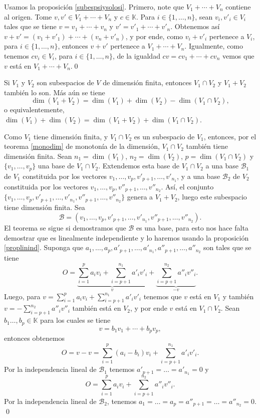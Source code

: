 \dem Usamos la proposición \ref{subespsiysolosi}. Primero, note que $V_1+\cdots+V_n$ contiene al origen. Tome $v,v'\in  V_1+\cdots+V_n$ y $c\in \mathbb{K}$. Para $i\in\{1,\ldots,n\}$, sean $v_i,v'_i\in V_i$ tales que se tiene $v=v_1+\cdots+v_n$ y $v'=v'_1+\cdots+v'_n$. Obtenemos as\'i $v+v'=(v_1+v'_1)+\cdots+(v_n+v'_n)$, y por ende, como $v_i+v'_i$ pertenece a $V_i$, para $i\in\{1,\ldots,n\}$, entonces $v+v'$ pertenece a $V_1+\cdots+V_n$. Igualmente, como tenemos $cv_i\in V_i$, para $i\in\{1,\ldots,n\}$, de la igualdad $cv=cv_1+\cdots+cv_n$ vemos que $v$ est\'a en $V_1+\cdots+V_n$.\qed

\begin{teo}\label{sumaint}
Si $V_1$ y $V_2$ son subespacios de $V$ de dimensi\'on finita, entonces $V_1\cap V_2$ y $V_1+V_2$ tambi\'en lo son. M\'as a\'un se tiene
\[
\dim(V_1+V_2)=\dim(V_1)+\dim(V_2)-\dim(V_1\cap V_2),
\]
o equivalentemente, $\dim(V_1)+\dim(V_2)=\dim(V_1+V_2)+\dim(V_1\cap V_2)$.
\end{teo}

\dem Como $V_1$ tiene dimensi\'on finita, y $V_1\cap V_2$ es un subespacio de $V_1$, entonces, por el teorema \ref{monodim} de monotonía de la dimensión, $V_1\cap V_2$ tambi\'en tiene dimensi\'on finita. Sean $n_1=\dim(V_1)$, $n_2=\dim(V_2)$, $p=\dim(V_1\cap V_2)$ y $\{v_1,\ldots,v_p\}$ una base de $V_1\cap V_2$. Extendemos esta base de $V_1\cap V_2$ a una base $\mathcal{B}_1$ de $V_1$ constituida por los vectores $v_1,\ldots,v_p,v'_{p+1},\ldots,v'_{n_1}$, y a una base $\mathcal{B}_2$ de $V_2$ constituida por los vectores $v_1,\ldots,v_p,v''_{p+1},\ldots,v''_{n_2}$. As\'i, el conjunto $\{v_1,\ldots,v_p,v'_{p+1},\ldots,v'_{n_1},v''_{p+1},\ldots,v''_{n_2}\}$ genera a $V_1+V_2$, luego este subespacio tiene dimensi\'on finita. Sea $$\mathcal{B}=(v_1,\ldots,v_p,v'_{p+1},\ldots,v'_{n_1},v''_{p+1},\ldots,v''_{n_2}).$$ El teorema se sigue si demostramos que $\mathcal{B}$ es una base, para esto nos hace falta demostrar que es linealmente independiente y lo haremos usando la proposici\'on \ref{proplinind}. Suponga que $a_1,\ldots,a_p,a'_{p+1},\ldots,a'_{n_1},a''_{p+1},\ldots,a''_{n_2}$ son tales que se tiene
\[
O=\underbrace{\sum_{i=1}^p a_iv_i+\sum_{i=p+1}^{n_1}a'_iv'_i}_{v}+\underbrace{\sum_{i=p+1}^{n_2} a''_iv''_i}_{-v}.
\]
Luego, para $v=\sum_{i=1}^p a_iv_i+\sum_{i=p+1}^{n_1}a'_iv'_i$ tenemos que $v$ est\'a en $V_1$ y también $v=-\sum_{i=p+1}^{n_2} a''_iv''_i$ tambi\'en está en $V_2$, y por ende $v$ est\'a en $V_1\cap V_2$. Sean $b_1\ldots,b_p\in \mathbb{K}$ para los cuales se tiene
\[
v=b_1v_1+\cdots+b_pv_p,
\]
entonces obtenemos
\[
O=v-v=\sum_{i=1}^p (a_i-b_i)v_i+\sum_{i=p+1}^{n_1}a'_iv'_i.
\]
Por la independencia lineal de $\mathcal{B}_1$ tenemos $a'_{p+1}=\ldots=a'_{n_1}=0$ y
\[
O=\sum_{i=1}^p a_iv_i+\sum_{i=p+1}^{n_2} a''_iv''_i.
\]
Por la independencia lineal de $\mathcal{B}_2$, tenemos $a_1=\ldots=a_p=a''_{p+1}=\ldots=a''_{n_2}=0$. \qed

